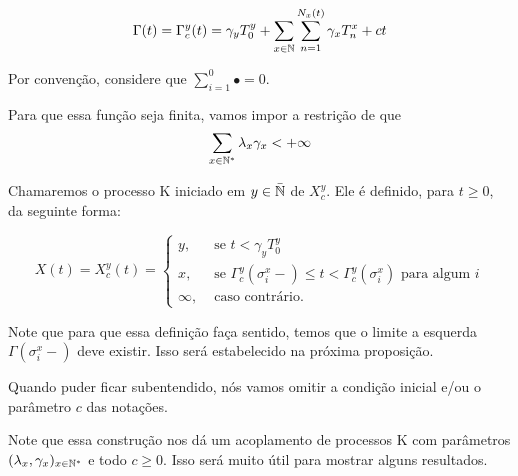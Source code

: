 \begin{equation}
  \label{def:Gamma}
  \Gamma(t) = \Gamma^y_c (t) = \gamma_y T_0^y
  + \sum_{x \in {\mathbb{N}}} \sum_{n = 1}^{N_x(t)}
  \gamma_x T_n^x
  + ct
\end{equation}

Por convenção, considere que $\sum_{i=1}^{0} \bullet = 0$.

Para que essa função seja \qc finita, vamos impor a restrição de que
\begin{equation}
  \sum_{x \in {\mathbb{N^*}}} \lambda_x\gamma_x < +\infty
\end{equation}

Chamaremos o processo K iniciado em $y \in {\bar{{\mathbb{N}}}}$ de $X^y_c$. Ele é
definido, para $t \geq 0$, da seguinte forma:

\begin{equation}
  \label{def:procK}
  X(t) = X^y_c (t) =
  \begin{cases}
    y, & \textrm{ se }  t < \gamma_y T_0^y\\
    x, & \textrm{ se } \Gamma^y_c(\sigma_i^x-) \leq t <
    \Gamma^y_c(\sigma^x_i)
    \textrm{ para algum } i \\
    \infty, & \textrm{ caso contrário.}
  \end{cases}
\end{equation}

Note que para que essa definição faça sentido, temos que o limite a
esquerda $\Gamma (\sigma_i^x-)$ deve existir. Isso será estabelecido
na próxima proposição.

Quando puder ficar subentendido, nós vamos omitir a condição inicial
e/ou o parâmetro $c$ das notações.

Note que essa construção nos dá um acoplamento de processos K com
parâmetros $(\lambda_x, \gamma_x)_{x \in {\mathbb{N^*}}}$ e todo $c \geq 0$. Isso
será muito útil para mostrar alguns resultados.

